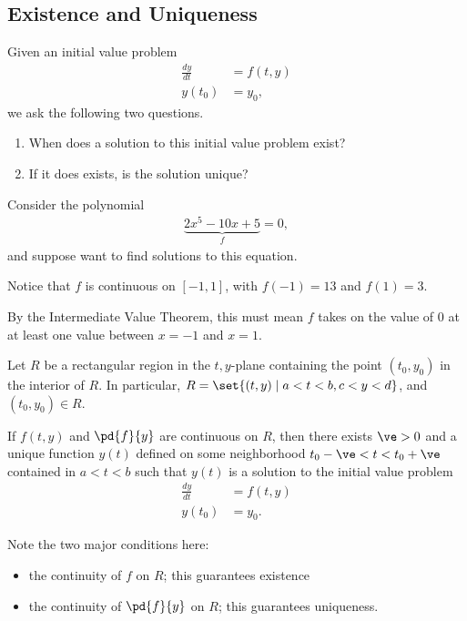\documentclass[10pt]{mypackage}
\begin{document}
\subsection{Existence and Uniqueness}%
Given an initial value problem
\begin{align*}
  \frac{dy}{dt} &= f(t,y)\\
  y\left(t_0\right) &= y_0,
\end{align*}
we ask the following two questions.
\begin{enumerate}[(1)]
  \item When does a solution to this initial value problem exist?
  \item If it does exists, is the solution unique?
\end{enumerate}
\begin{example}
  Consider the polynomial
  \begin{align*}
    \underbrace{2x^5 - 10x + 5}_{f} = 0,
  \end{align*}
  and suppose want to find solutions to this equation.\newline

  Notice that $f$ is continuous on $[-1,1]$, with $f(-1) = 13$ and $f(1) = 3$.\newline

  By the Intermediate Value Theorem, this must mean $f$ takes on the value of $0$ at at least one value between $x=-1$ and $x=1$.
\end{example}
\begin{theorem}
  Let $R$ be a rectangular region in the $t,y$-plane containing the point $\left(t_0,y_0\right)$ in the interior of $R$. In particular, $R = \set{(t,y)\mid a<t<b, c < y < d}$, and $\left(t_0,y_0\right)\in R$.\newline

  If $f(t,y)$ and $\pd{f}{y}$ are continuous on $R$, then there exists $\ve > 0$ and a unique function $y(t)$ defined on some neighborhood $t_0 - \ve < t < t_0 + \ve$ contained in $a < t < b$ such that $y(t)$ is a solution to the initial value problem
  \begin{align*}
    \frac{dy}{dt} &= f(t,y)\\
    y\left(t_0\right) &= y_0.
  \end{align*}
\end{theorem}
Note the two major conditions here:
\begin{itemize}
  \item the continuity of $f$ on $R$; this guarantees existence\\
  \item the continuity of $\pd{f}{y}$ on $R$; this guarantees uniqueness.
\end{itemize}
\end{document}
